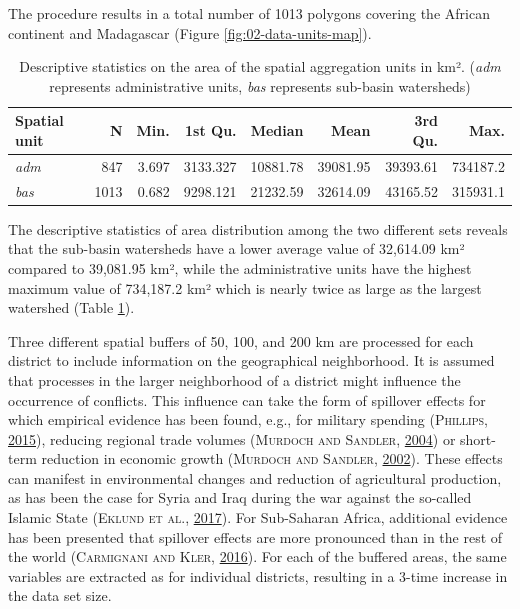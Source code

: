 \documentclass[a4paper,11pt]{article}
\begin{document}
The procedure results in a total number of 1013 polygons covering the African
continent and Madagascar (Figure \ref{fig:02-data-units-map}).
\begin{table}[H]

\caption[Descriptive statistics on the area of the spatial aggregation units.]{\label{tab:02-data-table-units-descr}Descriptive statistics on the area of the spatial aggregation units in km². (\textit{adm} represents administrative units, \textit{bas} represents sub-basin watersheds)}
\centering
\fontsize{10}{12}\selectfont
\begin{tabular}[t]{lrrrrrrr}
\toprule
Spatial unit & N & Min. & 1st Qu. & Median & Mean & 3rd Qu. & Max.\\
\midrule
\textit{adm} & 847 & 3.697 & 3133.327 & 10881.78 & 39081.95 & 39393.61 & 734187.2\\
\textit{bas} & 1013 & 0.682 & 9298.121 & 21232.59 & 32614.09 & 43165.52 & 315931.1\\
\bottomrule
\end{tabular}
\end{table}
The descriptive statistics of area distribution among the two different
sets reveals that the sub-basin watersheds have a lower average value of 32,614.09
km² compared to 39,081.95 km², while the administrative
units have the highest maximum value of 734,187.2 km²
which is nearly twice as large as the largest watershed (Table \ref{tab:02-data-table-units-descr}).

Three different spatial buffers of 50, 100, and 200 km are processed for each
district to include information on the geographical neighborhood. It is
assumed that processes in the larger neighborhood of a district might influence
the occurrence of conflicts. This influence can take the form of spillover
effects for which empirical evidence has been found, e.g., for military spending
\textsc{(\textnormal{\textsc{Phillips}}, \textnormal{\protect\hyperlink{ref-phillips2015}{2015}})}, reducing regional trade volumes \textsc{(\textnormal{\textsc{Murdoch} and \textsc{Sandler}}, \textnormal{\protect\hyperlink{ref-murdoch2004}{2004}})} or short-term
reduction in economic growth \textsc{(\textnormal{\textsc{Murdoch} and \textsc{Sandler}}, \textnormal{\protect\hyperlink{ref-murdoch2002}{2002}})}. These effects can manifest in
environmental changes and reduction of agricultural production, as has been
the case for Syria and Iraq during the war against the so-called Islamic State \textsc{(\textnormal{\textsc{Eklund} \textsc{et al.}}, \textnormal{\protect\hyperlink{ref-eklund2017}{2017}})}.
For Sub-Saharan Africa, additional evidence has been presented that spillover effects
are more pronounced than in the rest of the world \textsc{(\textnormal{\textsc{Carmignani} and \textsc{Kler}}, \textnormal{\protect\hyperlink{ref-carmignani2016}{2016}})}. For each
of the buffered areas, the same variables are extracted as for individual districts,
resulting in a 3-time increase in the data set size.
\end{document}

